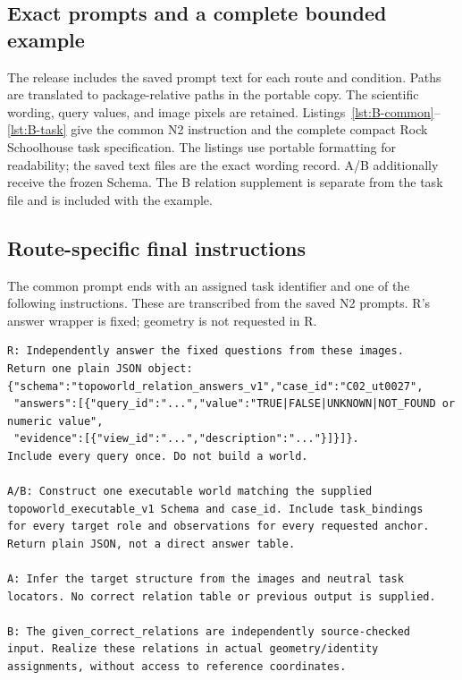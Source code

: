 \subsection{Exact prompts and a complete bounded example}
The release includes the saved prompt text for each route and condition. Paths are translated to package-relative paths in the portable copy. The scientific wording, query values, and image pixels are retained. Listings~\ref{lst:B-common}--\ref{lst:B-task} give the common N2 instruction and the complete compact Rock Schoolhouse task specification. The listings use portable formatting for readability; the saved text files are the exact wording record. A/B additionally receive the frozen Schema. The B relation supplement is separate from the task file and is included with the example.



\subsection{Route-specific final instructions}
The common prompt ends with an assigned task identifier and one of the following instructions. These are transcribed from the saved N2 prompts. R's answer wrapper is fixed; geometry is not requested in R.
\begin{lstlisting}
R: Independently answer the fixed questions from these images.
Return one plain JSON object:
{"schema":"topoworld_relation_answers_v1","case_id":"C02_ut0027",
 "answers":[{"query_id":"...","value":"TRUE|FALSE|UNKNOWN|NOT_FOUND or numeric value",
 "evidence":[{"view_id":"...","description":"..."}]}]}.
Include every query once. Do not build a world.

A/B: Construct one executable world matching the supplied
topoworld_executable_v1 Schema and case_id. Include task_bindings
for every target role and observations for every requested anchor.
Return plain JSON, not a direct answer table.

A: Infer the target structure from the images and neutral task
locators. No correct relation table or previous output is supplied.

B: The given_correct_relations are independently source-checked
input. Realize these relations in actual geometry/identity
assignments, without access to reference coordinates.
\end{lstlisting}

